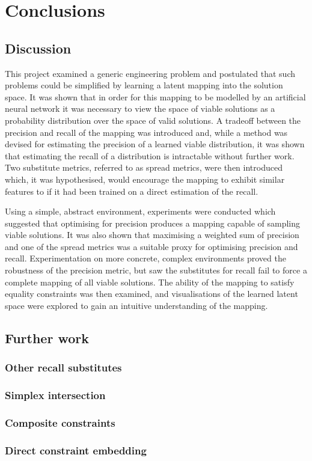 \documentclass[../../main.tex]{subfiles}
\begin{document}
\chapter{Conclusions}

\section{Discussion}

This project examined a generic engineering problem and postulated that such problems could be simplified by learning a latent mapping into the solution space.
It was shown that in order for this mapping to be modelled by an artificial neural network it was necessary to view the space of viable solutions as a probability distribution over the space of valid solutions.
A tradeoff between the precision and recall of the mapping was introduced and, while a method was devised for estimating the precision of a learned viable distribution, it was shown that estimating the recall of a distribution is intractable without further work.
Two substitute metrics, referred to as spread metrics, were then introduced which, it was hypothesised, would encourage the mapping to exhibit similar features to if it had been trained on a direct estimation of the recall.

Using a simple, abstract environment, experiments were conducted which suggested that optimising for precision produces a mapping capable of sampling viable solutions.
It was also shown that maximising a weighted sum of precision and one of the spread metrics was a suitable proxy for optimising precision and recall.
Experimentation on more concrete, complex environments proved the robustness of the precision metric, but saw the substitutes for recall fail to force a complete mapping of all viable solutions.
The ability of the mapping to satisfy equality constraints was then examined, and visualisations of the learned latent space were explored to gain an intuitive understanding of the mapping.

\section{Further work}
\subsection{Other recall substitutes}
\subsection{Simplex intersection}
\subsection{Composite constraints}
\subsection{Direct constraint embedding}
\end{document}
